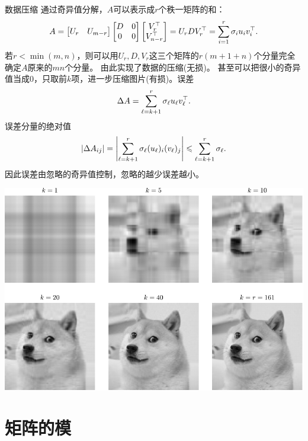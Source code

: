 \begin{example}{数据压缩}{}
	通过奇异值分解，$A$可以表示成$r$个秩一矩阵的和：
	\[
		A=\begin{bmatrix}
			U_r&U_{m-r}
		\end{bmatrix}\begin{bmatrix}
			D&0\\0&0
		\end{bmatrix}\begin{bmatrix}
			V_r^\top\\V_{n-r}^\top
		\end{bmatrix}=U_rDV_r^\top=\sum_{i=1}^r\sigma_iu_iv_i^\top.
	\]
	若$r<\min(m,n)$，则可以用$U_r,D,V_r$这三个矩阵的$r(m+1+n)$个分量完全确定$A$原来的$mn$个分量。
	由此实现了数据的压缩(无损)。
	\tcblower
	甚至可以把很小的奇异值当成0，只取前$k$项，进一步压缩图片(有损)。误差
	\[
		\Delta A=\sum_{\ell=k+1}^r\sigma_\ell u_\ell v_\ell^\top.
	\]
	误差分量的绝对值
	\[
		|\Delta A_{ij}|=\left\lvert\sum_{\ell=k+1}^r\sigma_\ell (u_\ell)_i (v_\ell)_j\right\rvert\leqslant\sum_{\ell=k+1}^r\sigma_\ell.
	\]
	因此误差由忽略的奇异值控制，忽略的越少误差越小。

	\begin{center}
        \includegraphics[width=0.8\linewidth]{figures/svcompress.pdf}
    \end{center}
\end{example}

\section{矩阵的模}

